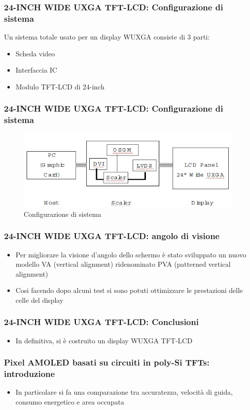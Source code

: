 \documentclass[12pt]{beamer}
\begin{document}
	\begin{frame}
		\frametitle{24-INCH WIDE UXGA TFT-LCD: Configurazione di sistema}
		Un sistema totale usato per un display WUXGA consiste di 3 parti:
		\begin{itemize}
			\item Scheda video
			\item Interfaccia IC
			\item Modulo TFT-LCD di 24-inch
		\end{itemize}
	\end{frame}
	\begin{frame}
		\frametitle{24-INCH WIDE UXGA TFT-LCD: Configurazione di sistema}
		\begin{figure}
			\centering
			\includegraphics[width=1\linewidth]{FISICA/sistema_di_conf}
			\caption{Configurazione di sistema}
			\label{fig:sistemadiconf}
		\end{figure}
	\end{frame}
	\begin{frame}
		\frametitle{24-INCH WIDE UXGA TFT-LCD: angolo di visione}
		\begin{itemize}
			\item Per migliorare la visione d’angolo dello schermo è stato sviluppato un nuovo
			modello VA (vertical alignment) ridenominato PVA (patterned
			vertical alignment)%
			\pause
			\item Cosi facendo dopo alcuni test si sono potuti ottimizzare le prestazioni delle celle del display 
		\end{itemize}
	\end{frame}
	\begin{frame}
		\frametitle{24-INCH WIDE UXGA TFT-LCD: Conclusioni}
		\begin{itemize}
			\item In definitiva, si è costruito un display WUXGA TFT-LCD 
		\end{itemize}
	\end{frame}
	\begin{frame}
		\frametitle{Pixel AMOLED basati su circuiti in poly-Si TFTs: introduzione}
		\begin{itemize}
			\item In particolare si fa una comparazione tra accuratezza, velocità di guida, consumo
			energetico e area occupata
		\end{itemize}
	\end{frame}
\end{document}
